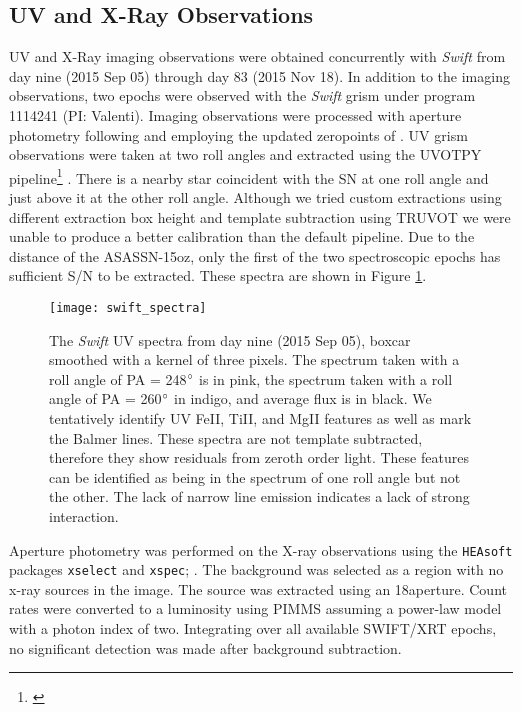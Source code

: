 \documentclass[a4paper,fleqn,usenatbib]{mnras}
\begin{document}
\subsection{UV and X-Ray Observations}\label{SecSwift}
UV and X-Ray imaging observations were obtained concurrently with \textit{Swift} from day nine (2015 Sep 05) through day 83 (2015 Nov 18).
In addition to the imaging observations, two epochs were observed with the \textit{Swift} grism under program 1114241 (PI: Valenti). 
Imaging observations were processed with aperture photometry following \citet{2009brown} and employing the updated zeropoints of \citet{2010breeveld}.
UV grism observations were taken at two roll angles and extracted using the UVOTPY pipeline\footnote{\citet{2014kuin}} \citep{2015kuin}. 
There is a nearby star coincident with the SN at one roll angle and just above it at the other roll angle.
Although we tried custom extractions using different extraction box height and template subtraction using TRUVOT \citep{2015smitka} we were unable to produce a better calibration than the default pipeline. 
Due to the distance of the ASASSN-15oz, only the first of the two spectroscopic epochs has sufficient S/N to be extracted. 
These spectra are shown in Figure \ref{fig:SwiftSpectrum}.
\begin{figure}
\begin{center}
\texttt{[image: swift\_spectra]} %
\caption{The {\it Swift }UV spectra from day nine (2015 Sep 05), boxcar smoothed with a kernel of three pixels. 
The spectrum taken with a roll angle of PA = 248$\rm{^{\circ}}$ is in pink, the  spectrum taken with a roll angle of PA = 260$\rm{^{\circ}}$ in indigo, and average flux is in black.
We tentatively identify UV FeII, TiII, and MgII features as well as mark the Balmer lines.
These spectra are not template subtracted, therefore they show residuals from zeroth order light. These features can be identified as being in the spectrum of one roll angle but not the other.
The lack of narrow line emission indicates a lack of strong interaction.}
\label{fig:SwiftSpectrum}
\end{center}
\end{figure}

Aperture photometry was performed on the X-ray observations using the  {\tt HEAsoft} packages {\tt xselect} \citep{blackburn_1995} and {\tt xspec}; \citep{arnaud_1996}.
The background was selected as a region with no x-ray sources in the image.
The source was extracted using an 18\arcsec aperture.
Count rates were converted to a luminosity using PIMMS \citep{mukai_1993} assuming a power-law model with a photon index of two.
Integrating over all available SWIFT/XRT epochs, no significant detection was made after background subtraction.
\end{document}
